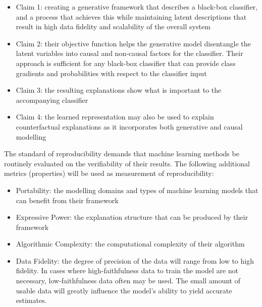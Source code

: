 \begin{itemize}
     \item Claim 1: creating a generative framework that describes a black-box classifier, and a process that achieves this while maintaining latent descriptions that result in high data fidelity and scalability of the overall system
     \item Claim 2: their objective function helps the generative model disentangle the latent variables into causal and non-causal factors for the classifier. Their approach is sufficient for any black-box classifier that can provide class gradients and probabilities with respect to the classifier input
     \item Claim 3: the resulting explanations show what is important to the accompanying classifier %
     \item Claim 4: the learned representation may also be used to explain counterfactual explanations as it incorporates both generative and causal modelling %
\end{itemize}

The standard of reproducibility demands that machine learning methods be routinely evaluated on the verifiability of their results. The following additional metrics (properties) will be used as measurement of reproducibility:
\begin{itemize}
    \item Portability: the modelling domains and types of machine learning models that can benefit from their framework %
    \item Expressive Power: the explanation structure that can be produced by their framework
    \item Algorithmic Complexity: the computational complexity of their algorithm
    \item Data Fidelity: the degree of precision of the data will range from low to high fidelity. In cases where high-faithfulness data to train the model are not necessary, low-faithfulness data often may be used. The small amount of usable data will greatly influence the model's ability to yield accurate estimates.
\end{itemize}

